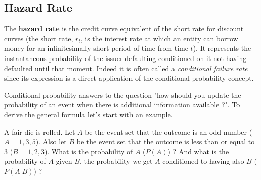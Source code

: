 %

\subsection{Hazard Rate}\label{hazard-rate}

The \textbf{hazard rate} is the credit curve equivalent of the short rate for discount curves (the short rate, $r_t$, is the interest rate at which an entity can borrow money for an infinitesimally short period of time from time $t$). It represents the instantaneous probability of the issuer defaulting conditioned on it not having defaulted until that moment. 
Indeed it is often called a \emph{conditional failure rate} since its expression is a direct application of the conditional probability concept.

Conditional probability answers to the question "how should you update the probability of an event when there is additional information available ?". To derive the general formula let's start with an example.

A fair die is rolled. Let \(A\) be the event set that the outcome is an odd number (\(A={1,3,5}\)). Also let \(B\) be the event set that the outcome is less than or equal to \(3\) (\(B={1,2,3}\)). What is the probability of \(A\) (\(P(A)\)) ? And what is the probability of \(A\) given \(B\), the probability we get $A$ conditioned to having also $B$ (\(P(A|B)\)) ?

